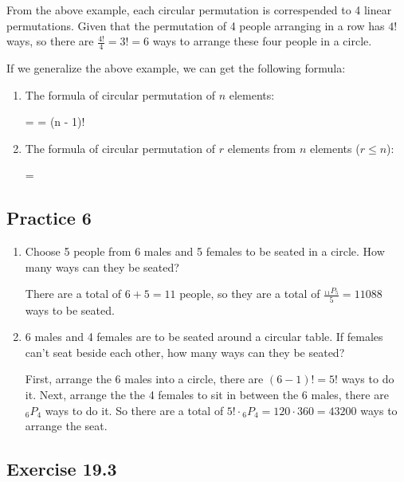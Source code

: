 \documentclass{report}
\newcommand\permtwo[2][^n]{{}_{#1}P_{#2}}
\begin{document}
\begin{multicols}{2}
  From the above example, each circular permutation is correspended to 4 linear
  permutations. Given that the permutation of 4 people arranging in a row has
  $4!$ ways, so there are $\frac{4!}{4} = 3! = 6$ ways to arrange these four
  people in a circle.

  If we generalize the above example, we can get the following formula:

  \begin{enumerate}
    \item The formula of circular permutation of $n$ elements:
          \begin{cequation}
            \frac{\permtwo[n]{n}}{n} =  = (n - 1)!
          \end{cequation}
    \item The formula of circular permutation of $r$ elements from $n$ elements ($r \leq
            n$):
          \begin{cequation}
            \frac{\permtwo[n]{r}}{r} = 
          \end{cequation}
  \end{enumerate}

  \subsection{Practice 6}

  \begin{enumerate}
    \item Choose 5 people from 6 males and 5 females to be seated in a circle. How many
          ways can they be seated? \sol{}

          There are a total of $6+5 = 11$ people, so they are a total of
          $\frac{\permtwo[11]{5}}{5} = 11088$ ways to be seated.

    \item 6 males and 4 females are to be seated around a circular table. If females can't seat beside each other, how many ways can they be seated?
          \sol{}

          First, arrange the 6 males into a circle, there are $(6-1)! = 5!$ ways to do
          it. Next, arrange the the 4 females to sit in between the 6 males, there are
          $\permtwo[6]{4}$ ways to do it. So there are a total of $5! \cdot
            \permtwo[6]{4} = 120 \cdot 360 = 43200$ ways to arrange the seat.
  \end{enumerate}

  \subsection{Exercise 19.3}


\end{multicols}
\end{document}
